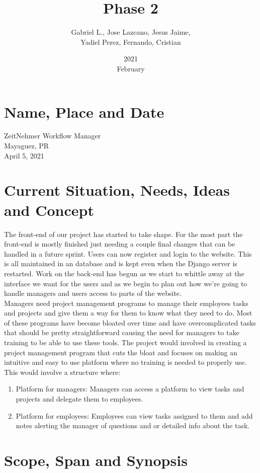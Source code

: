 \documentclass{article}[draft]
\title{Phase 2}
\date{2021\\February}
\author{Gabriel L., Jose Lazcano, Jesus Jaime,\\ Yadiel Perez, Fernando, Cristian}
\begin{document}
\maketitle
\section{Name, Place and Date}
ZeitNehmer Workflow Manager\\
Mayaguez, PR\\
April 5, 2021
\section{Current Situation, Needs, Ideas and Concept}

The front-end of our project has started to take shape. For the most part the front-end is mostly finished just needing a couple final changes that can be handled in a future sprint. Users can now register and login to the website. This is all maintained in an database and is kept even when the Django server is restarted. Work on the back-end has begun as we start to whittle away at the interface we want for the users and as we begin to plan out how we're going to handle managers and users access to parts of the website.
\\

Managers need project management programs to manage their employees tasks and projects and give them a way for them to know what they need to do. Most of these programs have become bloated over time and have overcomplicated tasks that should be pretty straightforward causing the need for managers to take training to be able to use these tools. The project would involved in creating a project management program that cuts the bloat and focuses on making an intuitive and easy to use platform where no training is needed to properly use. This would involve a structure where:
\begin{enumerate}
\item Platform for managers: Managers can access a platform to view tasks and projects and delegate them to employees.
\item Platform for employees: Employees can view tasks assigned to them and add notes alerting the manager of questions and or detailed info about the task.
\end{enumerate}
\section{Scope, Span and Synopsis}
\end{document}
